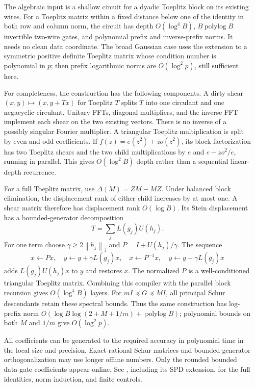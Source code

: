\documentclass[11pt]{article}
\newcommand{\norm}[1]{\left\lVert #1\right\rVert}
\newcommand{\plog}{\operatorname{polylog}}
\newcommand{\file}[1]{\href{#1}{\texttt{\detokenize{#1}}}}
\begin{document}
The algebraic input is a shallow circuit for a dyadic Toeplitz block on its existing wires. For a Toeplitz matrix within a fixed distance below one of the identity in both row and column norm, the circuit has depth $O(\log^4 B)$, $B\plog B$ invertible two-wire gates, and polynomial prefix and inverse-prefix norms. It needs no clean data coordinate. The broad Gaussian case uses the extension to a symmetric positive definite Toeplitz matrix whose condition number is polynomial in $p$; then prefix logarithmic norms are $O(\log^2p)$, still sufficient here.

For completeness, the construction has the following components. A dirty shear $(x,y)\mapsto(x,y+Tx)$ for Toeplitz $T$ splits $T$ into one circulant and one negacyclic circulant. Unitary FFTs, diagonal multipliers, and the inverse FFT implement each shear on the two existing vectors. There is no inverse of a possibly singular Fourier multiplier. A triangular Toeplitz multiplication is split by even and odd coefficients. If $f(z)=e(z^2)+zo(z^2)$, its block factorization has two Toeplitz shears and the two child multiplications by $e$ and $e-zo^2/e$, running in parallel. This gives $O(\log^2 B)$ depth rather than a sequential linear-depth recurrence.

For a full Toeplitz matrix, use $\Delta(M)=ZM-MZ$. Under balanced block elimination, the displacement rank of either child increases by at most one. A shear matrix therefore has displacement rank $O(\log B)$. Its Stein displacement has a bounded-generator decomposition
\[
 T=\sum_j L(g_j)U(h_j).
\]
For one term choose $\gamma\geq2\norm{h_j}_1$ and $P=I+U(h_j)/\gamma$. The sequence
\[
 x\leftarrow Px,\quad
 y\leftarrow y+\gamma L(g_j)x,\quad
 x\leftarrow P^{-1}x,\quad
 y\leftarrow y-\gamma L(g_j)x
\]
adds $L(g_j)U(h_j)x$ to $y$ and restores $x$. The normalized $P$ is a well-conditioned triangular Toeplitz matrix. Combining this compiler with the parallel block recursion gives $O(\log^4B)$ layers. For $mI\preceq G\preceq MI$, all principal Schur descendants retain these spectral bounds. Thus the same construction has log-prefix norm $O(\log B\log(2+M+1/m)+\plog B)$; polynomial bounds on both $M$ and $1/m$ give $O(\log^2p)$.

All coefficients can be generated to the required accuracy in polynomial time in the local size and precision. Exact rational Schur matrices and bounded-generator orthogonalization may use longer offline numbers. Only the rounded bounded data-gate coefficients appear online. See \file{SHALLOW-TOEPLITZ.md}, including its SPD extension, for the full identities, norm induction, and finite controls.
\end{document}
